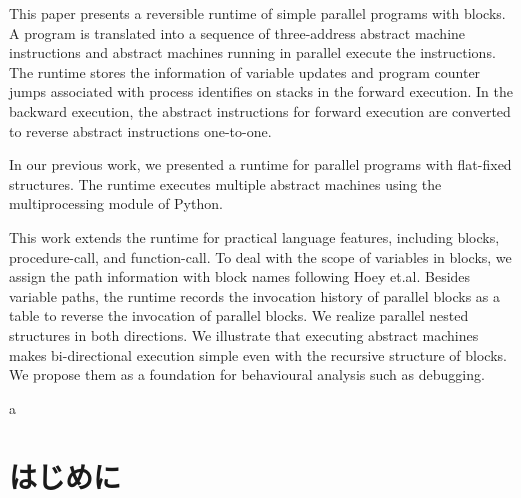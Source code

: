\documentclass[submit,PRO]{ipsj}
\begin{document}
\begin{eabstract}
This paper presents a reversible runtime of simple parallel programs
with blocks.  A program is translated into a sequence of three-address
abstract machine instructions and abstract machines running in
parallel execute the instructions.  The runtime stores the information
of variable updates and program counter jumps associated with process
identifies on stacks in the forward execution. In the backward
execution, the abstract instructions for forward execution are
converted to reverse abstract instructions one-to-one.

In our previous work, we presented a runtime for parallel programs with
flat-fixed structures.  The runtime executes multiple abstract
machines using the multiprocessing module of Python.

This work extends the runtime for practical language features,
including blocks, procedure-call, and function-call. To deal with the
scope of variables in blocks, we assign the path information with
block names following Hoey et.al.  Besides variable paths, the runtime
records the invocation history of parallel blocks as a table to
reverse the invocation of parallel blocks.  We realize parallel nested
structures in both directions.  We illustrate that executing abstract
machines makes bi-directional execution simple even with the recursive
structure of blocks.  We propose them as a foundation for behavioural
analysis such as debugging.

\end{eabstract}

\begin{ekeyword}
a
\end{ekeyword}

\maketitle

\section{はじめに}
\end{document}
